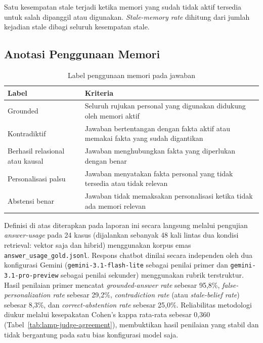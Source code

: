 Satu kesempatan stale terjadi ketika memori yang sudah tidak aktif tersedia untuk salah dipanggil atau digunakan. \textit{Stale-memory rate} dihitung dari jumlah kejadian stale dibagi seluruh kesempatan stale.

\subsection{Anotasi Penggunaan Memori}

\begin{table}[!htbp]
\centering
\caption{Label penggunaan memori pada jawaban}
{\footnotesize
\begin{tabularx}{\textwidth}{|>{\raggedright\arraybackslash}p{3.2cm}|>{\raggedright\arraybackslash}X|}
\hline
\rowcolor{tableheadgray}
\textbf{Label} & \textbf{Kriteria} \\
\hline
Grounded & Seluruh rujukan personal yang digunakan didukung oleh memori aktif \\
\hline
Kontradiktif & Jawaban bertentangan dengan fakta aktif atau memakai fakta yang sudah digantikan \\
\hline
Berhasil relasional atau kausal & Jawaban menghubungkan fakta yang diperlukan dengan benar \\
\hline
Personalisasi palsu & Jawaban menyatakan fakta personal yang tidak tersedia atau tidak relevan \\
\hline
Abstensi benar & Jawaban tidak memaksakan personalisasi ketika tidak ada memori relevan \\
\hline
\end{tabularx}
}
\end{table}

Definisi di atas diterapkan pada laporan ini secara langsung melalui pengujian \textit{answer-usage} pada 24 kasus (dijalankan sebanyak 48 kali lintas dua kondisi retrieval: vektor saja dan hibrid) menggunakan korpus emas \texttt{answer\_usage\_gold.jsonl}. Respons chatbot dinilai secara independen oleh dua konfigurasi Gemini (\texttt{gemini-3.1-flash-lite} sebagai penilai primer dan \texttt{gemini-3.1-pro-preview} sebagai penilai sekunder) menggunakan rubrik terstruktur. Hasil penilaian primer mencatat \textit{grounded-answer rate} sebesar 95,8\%, \textit{false-personalization rate} sebesar 29,2\%, \textit{contradiction rate} (atau \textit{stale-belief rate}) sebesar 8,3\%, dan \textit{correct-abstention rate} sebesar 25,0\%. Reliabilitas metodologi diukur melalui kesepakatan Cohen's kappa rata-rata sebesar 0,360 (Tabel~\ref{tab:lamp-judge-agreement}), membuktikan hasil penilaian yang stabil dan tidak bergantung pada satu bias konfigurasi model saja.

